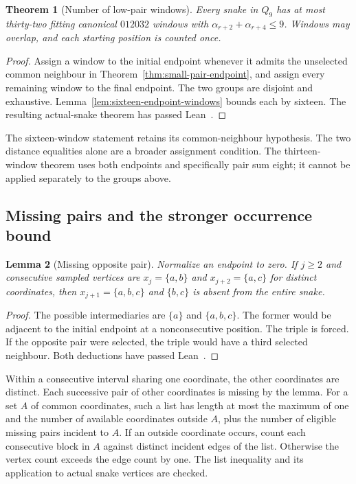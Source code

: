 \documentclass[11pt,a4paper]{article}
\newtheorem{theorem}{Theorem}[section]
\newtheorem{lemma}[theorem]{Lemma}
\theoremstyle{definition}
\theoremstyle{remark}
\newcommand{\Q}{Q}
\begin{document}
\begin{theorem}[Number of low-pair windows]\label{thm:thirty-two-windows}
Every snake in $\Q_9$ has at most thirty-two fitting canonical $012032$
windows with $\alpha_{r+2}+\alpha_{r+4}\le9$. Windows may overlap, and
each starting position is counted once.
\end{theorem}
\begin{proof}
Assign a window to the initial endpoint whenever it admits the unselected
common neighbour in Theorem~\ref{thm:small-pair-endpoint}, and assign every
remaining window to the final endpoint. The two groups are disjoint and
exhaustive. Lemma~\ref{lem:sixteen-endpoint-windows} bounds each by sixteen.
The resulting actual-snake theorem has passed Lean~\cite{occurrencearchive}.
\end{proof}
The sixteen-window statement retains its common-neighbour hypothesis. The
two distance equalities alone are a broader assignment condition. The
thirteen-window theorem uses both endpoints and specifically pair sum eight;
it cannot be applied separately to the groups above.

\subsection{Missing pairs and the stronger occurrence bound}\label{sec:missing-pair-occurrences}
\begin{lemma}[Missing opposite pair]\label{lem:missing-opposite-pair}
Normalize an endpoint to zero. If $j\ge2$ and consecutive sampled vertices
are $x_j=\{a,b\}$ and $x_{j+2}=\{a,c\}$ for distinct coordinates, then
$x_{j+1}=\{a,b,c\}$ and $\{b,c\}$ is absent from the entire snake.
\end{lemma}
\begin{proof}
The possible intermediaries are $\{a\}$ and $\{a,b,c\}$. The former would
be adjacent to the initial endpoint at a nonconsecutive position. The triple
is forced. If the opposite pair were selected, the triple would have a third
selected neighbour. Both deductions have passed Lean~\cite{occurrencearchive}.
\end{proof}

Within a consecutive interval sharing one coordinate, the other coordinates
are distinct. Each successive pair of other coordinates is missing by the
lemma. For a set $A$ of common coordinates, such a list has length at most
the maximum of one and the number of available coordinates outside $A$, plus
the number of eligible missing pairs incident to $A$. If an outside coordinate
occurs, count each consecutive block in $A$ against distinct incident edges
of the list. Otherwise the vertex count exceeds the edge count by one.
The list inequality and its application to actual snake vertices are checked.
\end{document}
